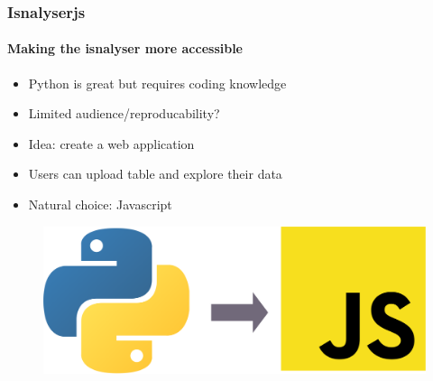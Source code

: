 \documentclass[9pt]{beamer}
\begin{document}
\begin{frame}
\frametitle{Isnalyserjs}
\framesubtitle{Making the isnalyser more accessible}
\begin{itemize}%
	\item Python is great but requires coding knowledge
	\item Limited audience/reproducability?
	\item Idea: create a web application
	\item Users can upload table and explore their data
	\item Natural choice: Javascript
\end{itemize}
	\begin{figure}
	\includegraphics[width=.6\linewidth]{figures/python2js.pdf}
\end{figure}
\end{frame} 
\end{document}
